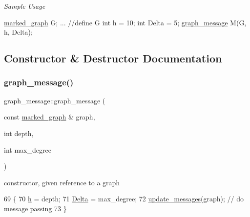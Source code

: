 {\itshape Sample Usage}


\begin{DoxyCode}
\hyperlink{classmarked__graph}{marked\_graph} G;
... \textcolor{comment}{//define G}
\textcolor{keywordtype}{int} h = 10;
\textcolor{keywordtype}{int} Delta = 5; 
\hyperlink{classgraph__message}{graph\_message} M(G, h, Delta);
\end{DoxyCode}
 

\subsection{Constructor \& Destructor Documentation}
\mbox{\label{classgraph__message_a792e738b94a19f914e5495c416defe4d}} 
\subsubsection{\texorpdfstring{graph\+\_\+message()}{graph\_message()}\hspace{0.1cm}{\footnotesize\ttfamily [1/2]}}
{\footnotesize\ttfamily graph\+\_\+message\+::graph\+\_\+message (\begin{DoxyParamCaption}\item[{const \hyperlink{classmarked__graph}{marked\+\_\+graph} \&}]{graph,  }\item[{int}]{depth,  }\item[{int}]{max\+\_\+degree }\end{DoxyParamCaption})\hspace{0.3cm}{\ttfamily [inline]}}



constructor, given reference to a graph 


\begin{DoxyCode}
69                                                                      \{
70     \hyperlink{classgraph__message_a934d63ed7275c211e13c6fb68824ed46}{h} = depth;
71     \hyperlink{classgraph__message_a45dfd061b7bc73572e5132fbf66efd55}{Delta} = max\_degree;
72     \hyperlink{classgraph__message_a40dadc59d582b290202e79bc4a9e896c}{update\_messages}(graph); \textcolor{comment}{// do message passing}
73   \}
\end{DoxyCode}
\mbox{\label{classgraph__message_aa21140453eb0e1de98a2ddfcf2832aeb}} 
